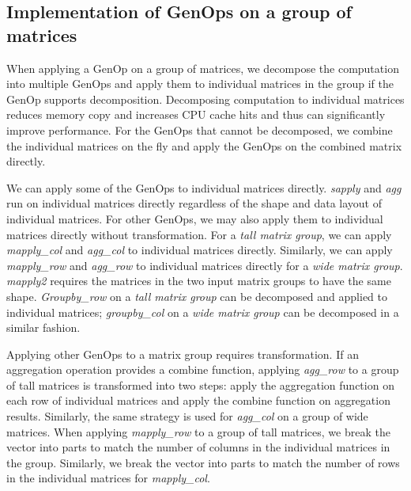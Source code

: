 \subsection{Implementation of GenOps on a group of matrices}

When applying a GenOp on a group of matrices,
we decompose the computation into multiple GenOps and apply them to individual
matrices in the group if the GenOp supports decomposition. Decomposing computation
to individual matrices reduces memory copy and increases CPU cache hits and thus
can significantly improve performance. For the GenOps that cannot be decomposed,
we combine the individual matrices on the fly and apply the GenOps on the combined
matrix directly.

We can apply some of the GenOps to individual matrices directly. \textit{sapply}
and \textit{agg} run on individual matrices directly regardless of the shape
and data layout of individual matrices. For other GenOps, we may also apply
them to individual matrices directly without transformation. For a
\textit{tall matrix group}, we can apply \textit{mapply\_col} and \textit{agg\_col}
to individual matrices directly.
Similarly, we can apply \textit{mapply\_row} and \textit{agg\_row} to
individual matrices directly for a \textit{wide matrix group}. \textit{mapply2}
requires the matrices in the two input matrix groups to have the same shape.
\textit{Groupby\_row} on a \textit{tall matrix group} can be decomposed and
applied to individual matrices; \textit{groupby\_col} on a \textit{wide matrix group}
can be decomposed in a similar fashion.

Applying other GenOps to a matrix group requires transformation. If an aggregation
operation provides a combine function, applying \textit{agg\_row} to a group of
tall matrices is transformed into two steps: apply the aggregation function on
each row of individual matrices and apply the combine function on aggregation
results. Similarly, the same strategy is used for \textit{agg\_col} on a group
of wide matrices. When applying \textit{mapply\_row} to a group of tall matrices,
we break the vector into parts to match the number of columns in the individual
matrices in the group. Similarly, we break the vector into parts to match the number
of rows in the individual matrices for \textit{mapply\_col}.

